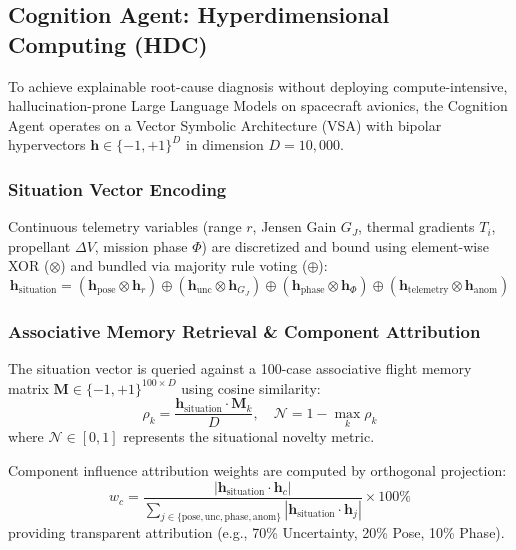 \documentclass[conference]{IEEEtran}
\begin{document}
\subsection{Cognition Agent: Hyperdimensional Computing (HDC)}

To achieve explainable root-cause diagnosis without deploying compute-intensive, hallucination-prone Large Language Models on spacecraft avionics, the Cognition Agent operates on a Vector Symbolic Architecture (VSA) with bipolar hypervectors $\mathbf{h} \in \{-1, +1\}^D$ in dimension $D=10,000$.

\subsubsection{Situation Vector Encoding}
Continuous telemetry variables (range $r$, Jensen Gain $G_J$, thermal gradients $T_i$, propellant $\Delta V$, mission phase $\Phi$) are discretized and bound using element-wise XOR ($\otimes$) and bundled via majority rule voting ($\oplus$):
\begin{equation}
\mathbf{h}_{\text{situation}} = (\mathbf{h}_{\text{pose}} \otimes \mathbf{h}_r) \oplus (\mathbf{h}_{\text{unc}} \otimes \mathbf{h}_{G_J}) \oplus (\mathbf{h}_{\text{phase}} \otimes \mathbf{h}_\Phi) \oplus (\mathbf{h}_{\text{telemetry}} \otimes \mathbf{h}_{\text{anom}})
\end{equation}

\subsubsection{Associative Memory Retrieval \& Component Attribution}
The situation vector is queried against a 100-case associative flight memory matrix $\mathbf{M} \in \{-1, +1\}^{100 \times D}$ using cosine similarity:
\begin{equation}
\rho_k = \frac{\mathbf{h}_{\text{situation}} \cdot \mathbf{M}_k}{D}, \quad \mathcal{N} = 1 - \max_{k} \rho_k
\end{equation}
where $\mathcal{N} \in [0, 1]$ represents the situational novelty metric.

Component influence attribution weights are computed by orthogonal projection:
\begin{equation}
w_c = \frac{|\mathbf{h}_{\text{situation}} \cdot \mathbf{h}_c|}{\sum_{j \in \{\text{pose}, \text{unc}, \text{phase}, \text{anom}\}} |\mathbf{h}_{\text{situation}} \cdot \mathbf{h}_j|} \times 100\%
\end{equation}
providing transparent attribution (e.g., 70\% Uncertainty, 20\% Pose, 10\% Phase).
\end{document}
